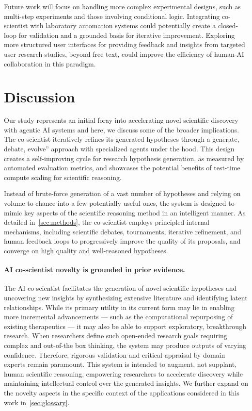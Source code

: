 Future work will focus on handling more complex experimental designs, such as multi-step experiments and those involving conditional logic. Integrating co-scientist with laboratory automation systems could potentially create a closed-loop for validation and a grounded basis for iterative improvement. Exploring more structured user interfaces for providing feedback and insights from targeted user research studies, beyond free text, could improve the efficiency of human-AI collaboration in this paradigm.


\vspace{-0.1cm}
\section{Discussion}
\vspace{-0.1cm}
\label{sec:discussion}
Our study represents an initial foray into accelerating novel scientific discovery with agentic AI systems and here, we discuss some of the broader implications. The co-scientist iteratively refines its generated hypotheses through a generate, debate, evolve'' approach with specialized agents under the hood. This design creates a self-improving cycle for research hypothesis generation, as measured by automated evaluation metrics, and showcases the potential benefits of test-time compute scaling for scientific reasoning.

Instead of brute-force generation of a vast number of hypotheses and relying on volume to chance into a few potentially useful ones, the system is designed to mimic key aspects of the scientific reasoning method in an intelligent manner. As detailed in~\cref{sec:methods}, the co-scientist employs principled internal mechanisms, including scientific debates, tournaments, iterative refinement, and human feedback loops to progressively improve the quality of its proposals, and converge on high quality and well-reasoned hypotheses.

\paragraph{AI co-scientist novelty is grounded in prior evidence.} The AI co-scientist facilitates the generation of novel scientific hypotheses and uncovering new insights by synthesizing extensive literature and identifying latent relationships. While its primary utility in its current form may lie in enabling more incremental advancements — such as the computational repurposing of existing therapeutics — it may also be able to support exploratory, breakthrough research. When researchers define such open-ended research goals requiring complex and out-of-the box thinking, the system may produce outputs of varying confidence. Therefore, rigorous validation and critical appraisal by domain experts remain paramount. This system is intended to augment, not supplant, human scientific reasoning, empowering researchers to accelerate discovery while maintaining intellectual control over the generated insights. We further expand on the novelty aspects in the specific context of the applications considered in this work in~\cref{sec:glossary}.

